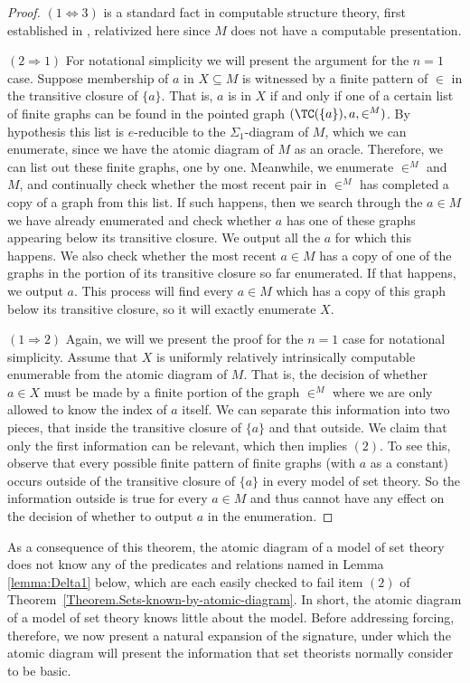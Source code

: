 \documentclass{amsart}
\begin{document}
 \begin{proof}
 $(1 \Leftrightarrow 3)$ is a standard fact in computable structure theory, first established in \cite{AKMS},
 relativized here since $M$ does not have a computable presentation.
 
 $(2 \Rightarrow 1)$ For notational simplicity we will present the argument for the $n = 1$ case. Suppose membership of $a$ in $X \subseteq M$ is witnessed by a finite pattern of $\in$ in the transitive closure of $\{a\}$. That is, $a$ is in $X$ if and only if one of a certain list of finite graphs can be found in the pointed graph $(\TC(\{a\}),a,\in^M)$. By hypothesis
 this list is $e$-reducible to the $\Sigma_1$-diagram of $M$, which we can enumerate,
 since we have the atomic diagram of $M$ as an oracle.  Therefore, we can list out these finite graphs,
 one by one.  Meanwhile, we enumerate $\in^M$ and $M$, and continually check whether the most recent pair in $\in^M$ has completed a copy of a graph from this list. If such happens, then we search through the $a \in M$ we have already enumerated and check whether $a$ has one of these graphs appearing below its transitive closure. We output all the $a$ for which this happens. We also check whether the most recent $a \in M$ has a copy of one of the graphs in the portion of its transitive closure so far enumerated. If that happens, we output $a$. This process will find every $a \in M$ which has a copy of this graph below its transitive closure, so it will exactly enumerate $X$.
 
 $(1 \Rightarrow 2)$ Again, we will we present the proof for the $n = 1$ case for notational simplicity. Assume that $X$ is uniformly relatively intrinsically computable enumerable from the atomic diagram of $M$. That is, the decision of whether $a \in X$ must be made by a finite portion of the graph $\in^M$ where we are only allowed to know the index of $a$ itself. We can separate this information into two pieces, that inside the transitive closure of $\{a\}$ and that outside. We claim that only the first information can be relevant, which then implies $(2)$. To see this, observe that every possible finite pattern of finite graphs (with $a$ as a constant) occurs outside of the transitive closure of $\{a\}$ in every model of set theory. So the information outside is true for every $a \in M$ and thus cannot have any effect on the decision of whether to output $a$ in the enumeration.
 \end{proof}
 
 As a consequence of this theorem, the atomic diagram of a model of set theory does not know any of the predicates
 and relations named in Lemma \ref{lemma:Delta1} below, which are each easily checked to fail item $(2)$ of Theorem~\ref{Theorem.Sets-known-by-atomic-diagram}.
 In short, the atomic diagram of a model of set theory knows little about the model.
 Before addressing forcing, therefore, we now present a natural expansion of the signature,
 under which the atomic diagram will present the information that set theorists normally consider to be basic.
 
\end{document}
